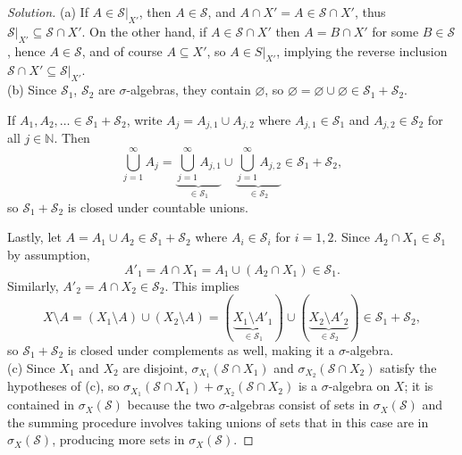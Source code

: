 \documentclass[10pt]{article}
\providecommand{\NN}{\mathbb N}
\newenvironment{soln}{\begin{proof}[Solution]}{\end{proof}}
\begin{document}
\begin{soln}
    (a) If $A\in\mathcal S|_{X'}$, then $A\in\mathcal S$,
    and $A\cap X' = A\in\mathcal S\cap X'$, thus
    $\mathcal S|_{X'}\subseteq\mathcal S\cap X'$.
    On the other hand, if $A \in\mathcal S\cap X'$ then $A = B\cap X'$
    for some $B\in\mathcal S$, hence $A\in\mathcal S$,
    and of course $A\subseteq X'$, so $A\in S|_{X'}$,
    implying the reverse inclusion $\mathcal S\cap X'\subseteq\mathcal S|_{X'}$.
    \\

    (b) Since $\mathcal S_1$, $\mathcal S_2$ are $\sigma$-algebras,
    they contain $\varnothing$, so
    $\varnothing = \varnothing\cup\varnothing\in\mathcal S_1 + \mathcal S_2$.

    If $A_1,A_2,\dots\in\mathcal S_1 + \mathcal S_2$,
    write $A_j = A_{j,1}\cup A_{j,2}$ where $A_{j,1}\in\mathcal S_1$
    and $A_{j,2}\in\mathcal S_2$ for all $j\in\NN$. Then
    \begin{equation*}
	\bigcup_{j=1}^\infty A_j =
	\underbrace{\bigcup_{j=1}^\infty A_{j,1}}_{\in\mathcal S_1}
	\cup\underbrace{\bigcup_{j=1}^\infty A_{j,2}}_{\in\mathcal S_2}
	\in\mathcal S_1 + \mathcal S_2,
    \end{equation*}
    so $\mathcal S_1 + \mathcal S_2$ is closed under countable unions.

    Lastly, let $A = A_1\cup A_2\in\mathcal S_1+\mathcal S_2$
    where $A_i\in\mathcal S_i$ for $i=1,2$.
    Since $A_2\cap X_1\in\mathcal S_1$ by assumption,
    \begin{equation*}
        A'_1 = A\cap X_1 = A_1\cup(A_2\cap X_1)\in\mathcal S_1.
    \end{equation*}
    Similarly, $A'_2 = A\cap X_2\in\mathcal S_2$.
    This implies
    \begin{equation*}
        X\setminus A = (X_1\setminus A)\cup(X_2\setminus A)
	= (\underbrace{X_1\setminus A'_1}_{\in\mathcal S_1})
	\cup (\underbrace{X_2\setminus A'_2}_{\in\mathcal S_2})
	\in\mathcal S_1+\mathcal S_2,
    \end{equation*}
    so $\mathcal S_1+\mathcal S_2$ is closed under complements as well,
    making it a $\sigma$-algebra.
    \\

    (c) Since $X_1$ and $X_2$ are disjoint,
    $\sigma_{X_1}(\mathcal S\cap X_1)$ and $\sigma_{X_2}(\mathcal S\cap X_2)$
    satisfy the hypotheses of (c), so
    $\sigma_{X_1}(\mathcal S\cap X_1) + \sigma_{X_2}(\mathcal S\cap X_2)$
    is a $\sigma$-algebra on $X$; it is contained in $\sigma_X(\mathcal S)$
    because the two $\sigma$-algebras consist of sets in $\sigma_X(\mathcal S)$
    and the summing procedure involves taking unions of sets
    that in this case are in $\sigma_X(\mathcal S)$,
    producing more sets in $\sigma_X(\mathcal S)$.


\end{soln}
\end{document}
